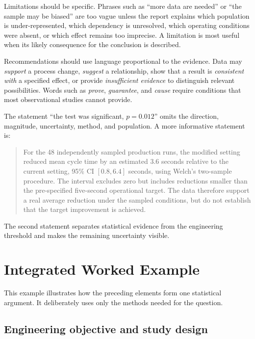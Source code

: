 Limitations should be specific. Phrases such as ``more data are needed'' or ``the sample may be biased'' are too vague unless the report explains which population is under-represented, which dependency is unresolved, which operating conditions were absent, or which effect remains too imprecise. A limitation is most useful when its likely consequence for the conclusion is described.

Recommendations should use language proportional to the evidence. Data may \emph{support} a process change, \emph{suggest} a relationship, show that a result is \emph{consistent with} a specified effect, or provide \emph{insufficient evidence} to distinguish relevant possibilities. Words such as \emph{prove}, \emph{guarantee}, and \emph{cause} require conditions that most observational studies cannot provide.

\begin{example}\par
The statement ``the test was significant, $p=0.012$'' omits the direction, magnitude, uncertainty, method, and population. A more informative statement is:

\begin{quote}
For the 48 independently sampled production runs, the modified setting reduced mean cycle time by an estimated 3.6 seconds relative to the current setting, 95\% CI $[0.8,6.4]$ seconds, using Welch's two-sample procedure. The interval excludes zero but includes reductions smaller than the pre-specified five-second operational target. The data therefore support a real average reduction under the sampled conditions, but do not establish that the target improvement is achieved.
\end{quote}

The second statement separates statistical evidence from the engineering threshold and makes the remaining uncertainty visible.
\end{example}

\section{Integrated Worked Example}
\label{sec:integrated-worked-example}

This example illustrates how the preceding elements form one statistical argument. It deliberately uses only the methods needed for the question.

\subsection{Engineering objective and study design}

